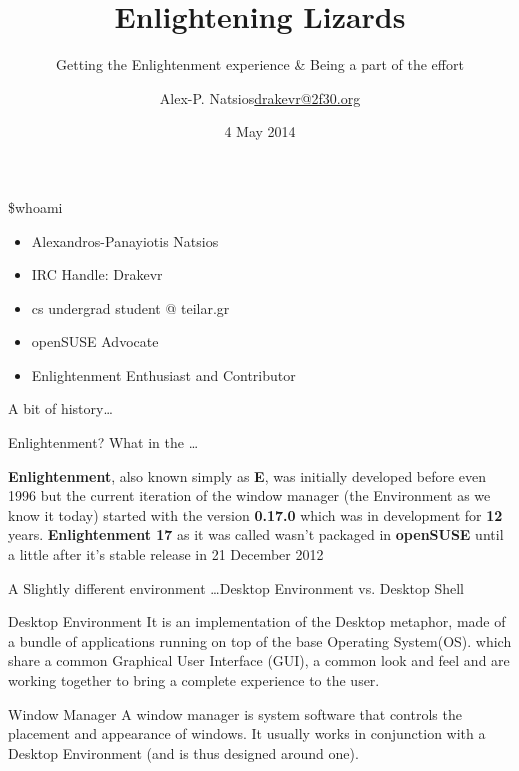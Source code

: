 \documentclass{beamer}
\title{Enlightening Lizards}
\subtitle{Getting the Enlightenment experience \& Being a part of the effort}
\author{\texorpdfstring{Alex-P. Natsios\newline\url{drakevr@2f30.org}}{Author}}
\institute{Fosscomm 2014 - Lamia}
\date{4 May 2014}
\begin{document}
    \begin{frame}
       \titlepage
    \end{frame}

    \begin{frame}{\$whoami}
        \begin{itemize}
            \item Alexandros-Panayiotis Natsios
            \item IRC Handle: Drakevr
            \item cs undergrad student @ teilar.gr
            \item openSUSE Advocate
            \item Enlightenment Enthusiast and Contributor
        \end{itemize}
    \end{frame}

    \begin{frame}
        \center\huge A bit of history\ldots
    \end{frame}

    \begin{frame}{Enlightenment? What in the \ldots}

        {\bf Enlightenment}, also known simply as {\bf E}, was initially
        developed before even 1996 but the current iteration of the window
        manager (the Environment as we know it today) started with the version
        {\bf 0.17.0} which was in development for {\bf 12} years.
        {\bf Enlightenment 17} as it was called wasn't packaged in {\bf openSUSE}
        until a little after it's stable release in 21 December 2012

    \end{frame}

    \begin{frame}{A Slightly different environment \ldots}{Desktop Environment vs. Desktop Shell}
        \begin{block}{Desktop Environment}
            It is an implementation of the Desktop metaphor, made of a bundle of
            applications running on top of the base Operating System(OS). which
            share a common Graphical User Interface (GUI), a common look and
            feel and are working together to bring a complete experience to the
            user.
        \end{block}

        \begin{block}{Window Manager}
            A window manager is system software that controls the placement and
            appearance of windows.
            It usually works in conjunction with a Desktop Environment (and is
            thus designed around one).
        \end{block}
    \end{frame}
\end{document}
